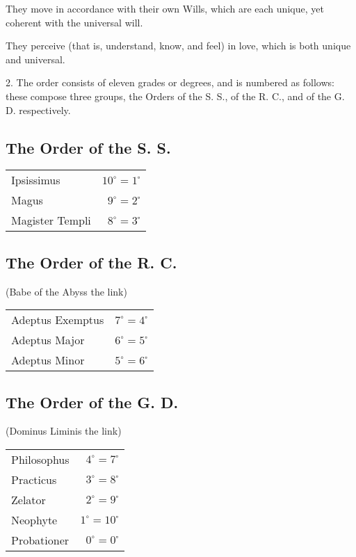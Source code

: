 They move in accordance with their own Wills, which are each unique, yet coherent with the universal will.

They perceive (that is, understand, know, and feel) in love, which is both unique and universal.

2. The order consists of eleven grades or degrees, and is numbered as follows: these compose three groups, the Orders of the S. S., of the R. C., and of the G. D. respectively.

\subsection*{The Order of the S. S.}
\begin{center}
  \begin{tabular}{p{} r}
    Ipsissimus \dotfill & $10^{\circ}=1^{\square}$ \\
    Magus \dotfill & $9^{\circ}=2^{\square}$ \\
    Magister Templi \dotfill & $8^{\circ}=3^{\square}$ \\
    \end{tabular}
\end{center}

\subsection*{The Order of the R. C.}
\begin{center}
  (Babe of the Abyss \textemdash{} the link)

  \begin{tabular}{p{} r}
    Adeptus Exemptus \dotfill & $7^{\circ}=4^{\square}$ \\
    Adeptus Major \dotfill & $6^{\circ}=5^{\square}$ \\
    Adeptus Minor \dotfill & $5^{\circ}=6^{\square}$ \\
  \end{tabular}
\end{center}

\subsection*{The Order of the G. D.}
\begin{center}
  (Dominus Liminis \textemdash{} the link)

  \begin{tabular}{p{} r}
    Philosophus \dotfill & $4^{\circ}=7^{\square}$ \\
    Practicus \dotfill & $3^{\circ}=8^{\square}$ \\
    Zelator \dotfill & $2^{\circ}=9^{\square}$ \\
    Neophyte \dotfill & $1^{\circ}=10^{\square}$ \\
    Probationer \dotfill & $0^{\circ}=0^{\square}$ \\
  \end{tabular}
\end{center}

